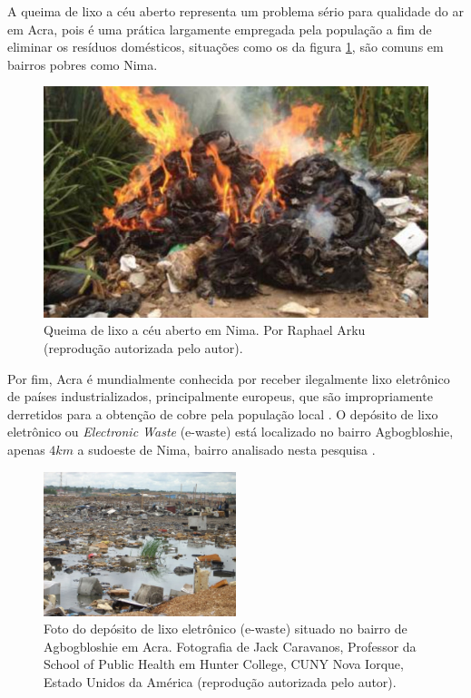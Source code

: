 A queima de lixo a céu aberto representa um problema sério para qualidade do
ar em Acra, pois é uma prática largamente empregada pela população a fim de 
eliminar os resíduos domésticos, situações como os da figura \ref{fig:nima_lixo}, 
são comuns em bairros pobres como Nima.  

\begin{figure}[H]
  \centering
    \includegraphics[width=0.5\linewidth]{../inputs/images/zheng/arku3.jpeg}
    \caption{Queima de lixo a céu aberto em Nima. Por Raphael Arku 
           (reprodução autorizada pelo autor).\label{fig:nima_lixo}}
\end{figure} 

Por fim, Acra é mundialmente conhecida por receber ilegalmente lixo 
eletrônico de países industrializados, principalmente europeus, 
que são impropriamente derretidos para a obtenção de cobre pela população local
\citep{asampong2015}. 
O depósito de lixo eletrônico ou \textit{Electronic Waste} (e-waste) está 
localizado no bairro Agbogbloshie, apenas $4 km$ a sudoeste de 
Nima, bairro analisado nesta pesquisa .

\begin{figure}[H]
  \centering
  \includegraphics[width=0.5\textwidth]{../inputs/images/ewaste_jack_caravano.jpg}
  \caption{Foto do depósito de lixo eletrônico (e-waste) situado no bairro 
           de Agbogbloshie em Acra. Fotografia de Jack Caravanos, 
           Professor da School of Public Health em Hunter College, CUNY
           Nova Iorque, Estado Unidos da América 
           (reprodução autorizada pelo autor). \label{fig:ewaste}}
\end{figure}

